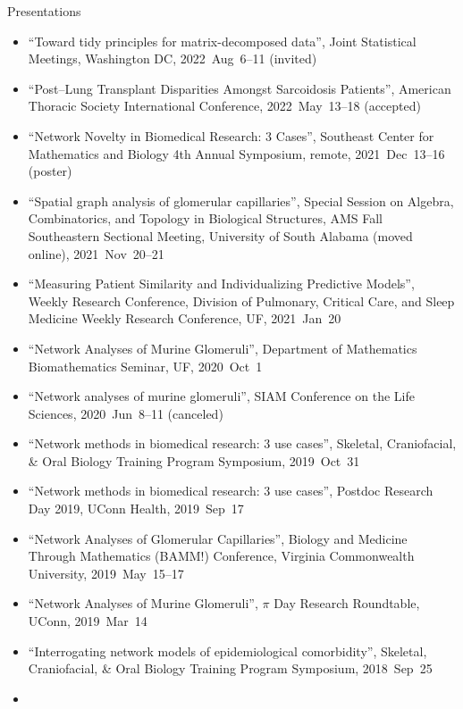 \documentclass[10pt,a4paper]{article}
\begin{document}
\vspace{.25cm}
{\sc Presentations}
\begin{itemize}[label=$\circ$,nolistsep]
\item
``Toward tidy principles for matrix-decomposed data'', Joint Statistical Meetings, Washington  DC, 2022~Aug~6--11 (invited)
\item
``Post--Lung Transplant Disparities Amongst Sarcoidosis Patients'', American Thoracic Society International Conference, 2022~May~13--18 (accepted)
\item
``Network Novelty in Biomedical Research: 3 Cases'', Southeast Center for Mathematics and Biology 4th Annual Symposium, remote, 2021~Dec~13--16 (poster)
\item
``Spatial graph analysis of glomerular capillaries'', Special Session on Algebra, Combinatorics, and Topology in Biological Structures, AMS Fall Southeastern Sectional Meeting, University of South Alabama (moved online), 2021~Nov~20--21
\item
``Measuring Patient Similarity and Individualizing Predictive Models'', Weekly Research Conference, Division of Pulmonary, Critical Care, and Sleep Medicine Weekly Research Conference, UF, 2021~Jan~20
\item
``Network Analyses of Murine Glomeruli'', Department of Mathematics Biomathematics Seminar, UF, 2020~Oct~1
\item
``Network analyses of murine glomeruli'', SIAM Conference on the Life Sciences, 2020~Jun~8--11 (canceled)
\item
``Network methods in biomedical research: 3 use cases'', Skeletal, Craniofacial, \& Oral Biology Training Program Symposium, 2019~Oct~31
\item
``Network methods in biomedical research: 3 use cases'', Postdoc Research Day 2019, UConn Health, 2019~Sep~17
\item
``Network Analyses of Glomerular Capillaries'', Biology and Medicine Through Mathematics (BAMM!) Conference, Virginia Commonwealth University, 2019~May~15--17
\item
``Network Analyses of Murine Glomeruli'', $\pi$ Day Research Roundtable, UConn, 2019~Mar~14
\item
``Interrogating network models of epidemiological comorbidity'', Skeletal, Craniofacial, \& Oral Biology Training Program Symposium, 2018~Sep~25
\item

\end{itemize}
\end{document}
